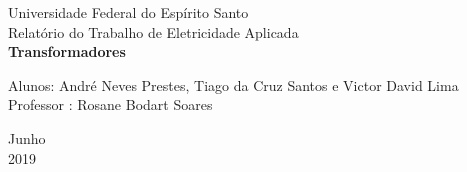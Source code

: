 \documentclass[a4paper, 12pt]{article}
\begin{document}

\begin{titlepage}
	\begin{center}
	

		\Huge{Universidade Federal do Espírito Santo}\\
		\large{Relatório do Trabalho de Eletricidade Aplicada}\\ 
		\vspace{15pt}
        \vspace{95pt}
        \textbf{\LARGE{Transformadores}}\\
		\vspace{3,5cm}
	\end{center}
	
	\begin{flushleft}
		\begin{tabbing}
			Alunos: André Neves Prestes, Tiago da Cruz Santos e Victor David Lima\\
			Professor : Rosane Bodart Soares\\
	\end{tabbing}
 \end{flushleft}
	\vspace{1cm}
	
	\begin{center}
		\vspace{\fill}
			 Junho\\
		 2019
			\end{center}
\end{titlepage}

\end{document}
